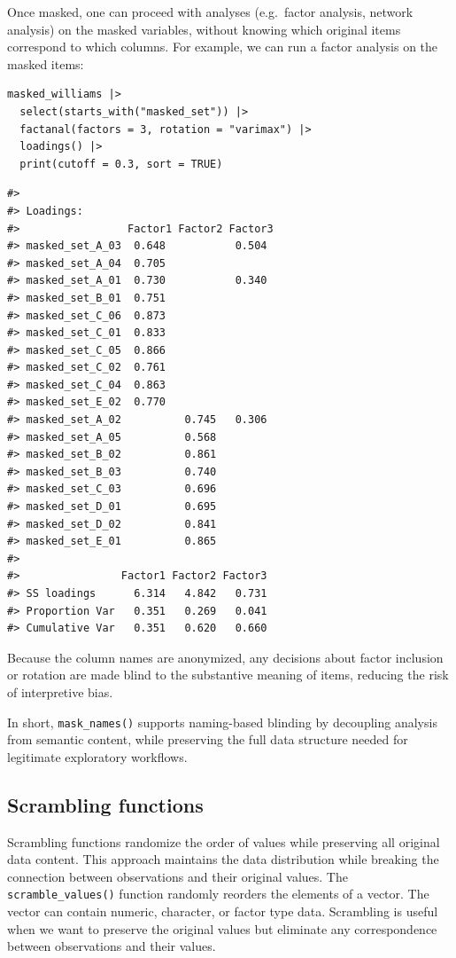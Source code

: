 Once masked, one can proceed with analyses (e.g.~factor analysis, network analysis) on the masked variables, without knowing which original items correspond to which columns. For example, we can run a factor analysis on the masked items:

\begin{verbatim}
masked_williams |> 
  select(starts_with("masked_set")) |> 
  factanal(factors = 3, rotation = "varimax") |> 
  loadings() |> 
  print(cutoff = 0.3, sort = TRUE)
\end{verbatim}

\begin{verbatim}
#> 
#> Loadings:
#>                 Factor1 Factor2 Factor3
#> masked_set_A_03  0.648           0.504 
#> masked_set_A_04  0.705                 
#> masked_set_A_01  0.730           0.340 
#> masked_set_B_01  0.751                 
#> masked_set_C_06  0.873                 
#> masked_set_C_01  0.833                 
#> masked_set_C_05  0.866                 
#> masked_set_C_02  0.761                 
#> masked_set_C_04  0.863                 
#> masked_set_E_02  0.770                 
#> masked_set_A_02          0.745   0.306 
#> masked_set_A_05          0.568         
#> masked_set_B_02          0.861         
#> masked_set_B_03          0.740         
#> masked_set_C_03          0.696         
#> masked_set_D_01          0.695         
#> masked_set_D_02          0.841         
#> masked_set_E_01          0.865         
#> 
#>                Factor1 Factor2 Factor3
#> SS loadings      6.314   4.842   0.731
#> Proportion Var   0.351   0.269   0.041
#> Cumulative Var   0.351   0.620   0.660
\end{verbatim}

Because the column names are anonymized, any decisions about factor inclusion or rotation are made blind to the substantive meaning of items, reducing the risk of interpretive bias.

In short, \texttt{mask\_names()} supports naming-based blinding by decoupling analysis from semantic content, while preserving the full data structure needed for legitimate exploratory workflows.

\subsection{Scrambling functions}\label{scrambling-functions}

Scrambling functions randomize the order of values while preserving all original data content. This approach maintains the data distribution while breaking the connection between observations and their original values. The \texttt{scramble\_values()} function randomly reorders the elements of a vector. The vector can contain numeric, character, or factor type data. Scrambling is useful when we want to preserve the original values but eliminate any correspondence between observations and their values.

